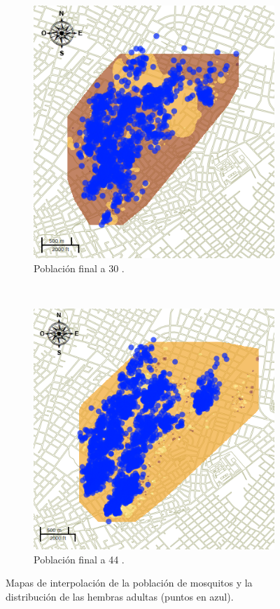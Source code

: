 \begin{figure}[!t]
    \begin{subfigure}[b]{0.225\textwidth}
        \includegraphics[width=\textwidth]{./graphics/temp-30-final.png}
        \caption{ Población final a 30 \textcelsius.}
    \end{subfigure}
    ~~~~
    \begin{subfigure}[b]{0.225\textwidth}
        \includegraphics[width=\textwidth]{./graphics/temp-34-final.png}
        \caption{ Población final a 44 \textcelsius.}
    \end{subfigure}
\caption{\label{fig:poblacion-mapas-all} Mapas de interpolación de la población de mosquitos y la distribución de las hembras adultas (puntos en azul).}
\end{figure}

